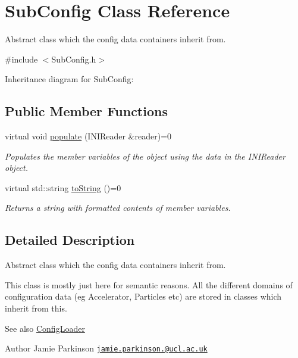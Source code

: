 \hypertarget{classSubConfig}{\section{Sub\+Config Class Reference}
\label{classSubConfig}
}


Abstract class which the config data containers inherit from.  




{\ttfamily \#include $<$Sub\+Config.\+h$>$}



Inheritance diagram for Sub\+Config\+:
\subsection*{Public Member Functions}
\begin{DoxyCompactItemize}
\item 
virtual void \hyperlink{classSubConfig_afe8a45f5bc9122755af2fa4a38c937d7}{populate} (I\+N\+I\+Reader \&reader)=0
\begin{DoxyCompactList}\small\item\em Populates the member variables of the object using the data in the I\+N\+I\+Reader object. \end{DoxyCompactList}\item 
virtual std\+::string \hyperlink{classSubConfig_aaaef674182db54e8d13eec1456e1ab5b}{to\+String} ()=0
\begin{DoxyCompactList}\small\item\em Returns a string with formatted contents of member variables. \end{DoxyCompactList}\end{DoxyCompactItemize}


\subsection{Detailed Description}
Abstract class which the config data containers inherit from. 

This class is mostly just here for semantic reasons. All the different domains of configuration data (eg Accelerator, Particles etc) are stored in classes which inherit from this.

\begin{DoxySeeAlso}{See also}
\hyperlink{classConfigLoader}{Config\+Loader}
\end{DoxySeeAlso}
\begin{DoxyAuthor}{Author}
Jamie Parkinson \href{mailto:jamie.parkinson.12@ucl.ac.uk}{\tt jamie.\+parkinson.@ucl.\+ac.\+uk} 
\end{DoxyAuthor}


